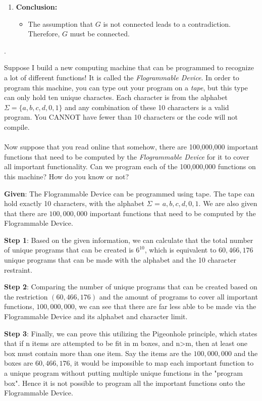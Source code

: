 \documentclass[12pt]{article}
\newcounter{quesnum}
\newcommand{\question}[2][??]{
\begin{list}{\labelitemi}{\leftmargin=2em}
\item [\arabic{quesnum}.] {} {#2}
\end{list}
\addtocounter{quesnum}{1}
}
\begin{document}
\begin{enumerate}
    \item \textbf{Conclusion:}
    \begin{itemize}
        \item The assumption that $G$ is not connected leads to a contradiction. Therefore, $G$ must be connected.
    \end{itemize}
\end{enumerate}


\question[3]{
Suppose I build a new computing machine that can be programmed to recognize a lot of different functions! It is called the \emph{Flogrammable Device}. In order to program this machine, you can type out your program on a \emph{tape}, but this type can only hold ten unique charactes. Each character is from the alphabet $\Sigma=\{a,b,c,d,0,1\}$ and any combination of these 10 characters is a valid program. You CANNOT have fewer than 10 characters or the code will not compile.\\
\\
Now suppose that you read online that somehow, there are 100,000,000 important functions that need to be computed by the \emph{Flogrammable Device} for it to cover all important functionality. Can we program each of the 100,000,000 functions on this machine? How do you know or not?


\textbf{Given}: The Flogrammable Device can be programmed using tape. The tape can hold exactly 10 characters, with the alphabet $\Sigma$ = ${a,b,c,d,0,1}$. We are also given that there are $100,000,000$ important functions that need to be computed by the Flogrammable Device.

\textbf{Step 1}: Based on the given information, we can calculate that the total number of unique programs that can be created is $6^{10}$, which is equivalent to $60,466,176$ unique programs that can be made with the alphabet and the 10 character restraint.

\textbf{Step 2}: Comparing the number of unique programs that can be created based on the restriction $(60,466,176)$ and the amount of programs to cover all important functions, $100,000,000$, we can see that there are far less able to be made via the Flogrammable Device and its alphabet and character limit.

\textbf{Step 3}: Finally, we can prove this utilizing the Pigeonhole principle, which states that if n items are attempted to be fit in m boxes, and n>m, then at least one box must contain more than one item. Say the items are the $100,000,000$ and the boxes are $60,466,176$, it would be impossible to map each important function to a unique program without putting multiple unique functions in the "program box". Hence it is not possible to program all the important functions onto the Flogrammable Device.

}
\end{document}
